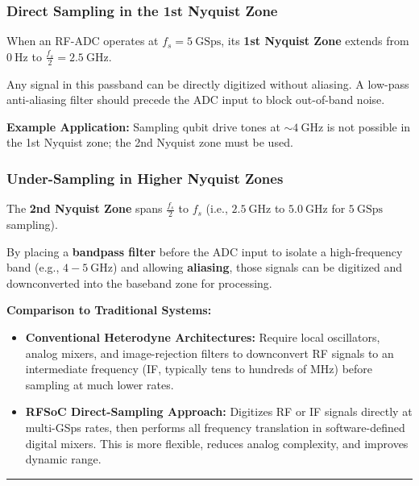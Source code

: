 \documentclass[
]{article}
\providecommand{\tightlist}{%
  \setlength{\itemsep}{0pt}\setlength{\parskip}{0pt}}
\begin{document}
\subsubsection{Direct Sampling in the 1st Nyquist
Zone}\label{direct-sampling-in-the-1st-nyquist-zone}

When an RF-ADC operates at \(f_s = 5\ \text{GSps}\), its \textbf{1st
Nyquist Zone} extends from \(0\ \text{Hz}\) to
\(\frac{f_s}{2} = 2.5\ \text{GHz}\).

Any signal in this passband can be directly digitized without aliasing.
A low-pass anti-aliasing filter should precede the ADC input to block
out-of-band noise.

\textbf{Example Application:} Sampling qubit drive tones at
\(\sim 4\ \text{GHz}\) is not possible in the 1st Nyquist zone; the 2nd
Nyquist zone must be used.

\subsubsection{Under-Sampling in Higher Nyquist
Zones}\label{under-sampling-in-higher-nyquist-zones}

The \textbf{2nd Nyquist Zone} spans \(\frac{f_s}{2}\) to \(f_s\) (i.e.,
\(2.5\ \text{GHz}\) to \(5.0\ \text{GHz}\) for \(5\ \text{GSps}\)
sampling).

By placing a \textbf{bandpass filter} before the ADC input to isolate a
high-frequency band (e.g., \(4 - 5\ \text{GHz}\)) and allowing
\textbf{aliasing}, those signals can be digitized and downconverted into
the baseband zone for processing.

\textbf{Comparison to Traditional Systems:}

\begin{itemize}
\tightlist
\item
  \textbf{Conventional Heterodyne Architectures:} Require local
  oscillators, analog mixers, and image-rejection filters to downconvert
  RF signals to an intermediate frequency (IF, typically tens to
  hundreds of MHz) before sampling at much lower rates.
\item
  \textbf{RFSoC Direct-Sampling Approach:} Digitizes RF or IF signals
  directly at multi-GSps rates, then performs all frequency translation
  in software-defined digital mixers. This is more flexible, reduces
  analog complexity, and improves dynamic range.
\end{itemize}

\begin{center}\rule{0.5\linewidth}{0.5pt}\end{center}
\end{document}
